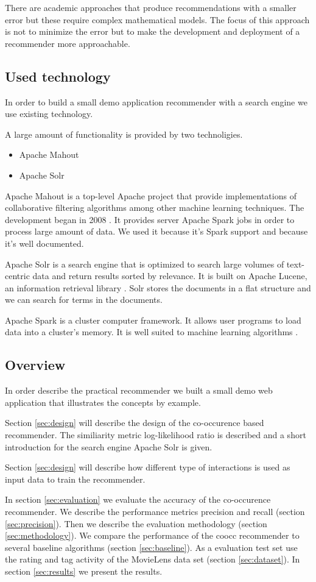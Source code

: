 There are academic approaches that produce recommendations with a smaller error but these require complex mathematical models. The focus of this approach is not to minimize the error but to make the development and deployment of a recommender more approachable.

\subsection{Used technology}
\label{sec:tech}

In order to build a small demo application recommender with a search engine we use existing technology.

A large amount of functionality is provided by two technoligies.
\begin{itemize}
\item Apache Mahout
\item Apache Solr
\end{itemize}

Apache Mahout is a top-level Apache project that provide implementations of collaborative filtering algorithms among other machine learning techniques. The development began in 2008 \cite{Owen}. It provides server Apache Spark jobs in order to process large amount of data. We used it because it's Spark support and because it's well documented.

Apache Solr is a search engine that is optimized to search large volumes of text-centric data and return results sorted by relevance. It is built on Apache Lucene, an information retrieval library \cite{grainger}. Solr stores the documents in a flat structure and we can search for terms in the documents.

Apache Spark is a cluster computer framework. It allows user programs to load data into a cluster's memory. It is well suited to machine learning algorithms \cite{Karau}.

\subsection{Overview}

In order describe the practical recommender we built a small demo web application that illustrates the concepts by example.

Section \ref{sec:design} will describe the design of the co-occurence based recommender. The similiarity metric log-likelihood ratio is described and a short introduction for the search engine Apache Solr is given.

Section \ref{sec:design} will describe how different type of interactions is used as input data to train the recommender.

In section \ref{sec:evaluation} we evaluate the accuracy of the co-occurence recommender. We describe the performance metrics \gls{precision} and \gls{recall} (section \ref{sec:precision}). Then we describe the evaluation methodology (section \ref{sec:methodology}). We compare the performance of the \gls{coocc} recommender to several baseline algorithms (section \ref{sec:baseline}). As a evaluation test set use the rating and tag activity of the MovieLens data set (section \ref{sec:dataset}). In section \ref{sec:results} we present the results.